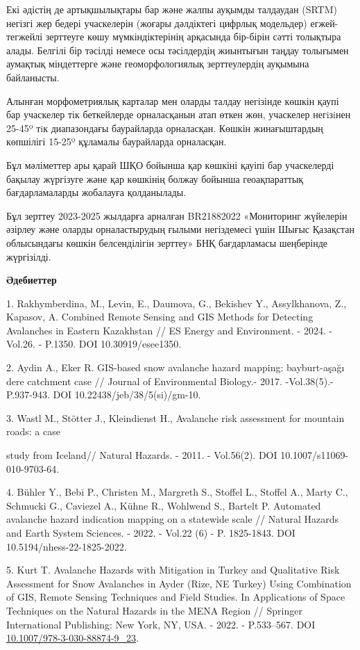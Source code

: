 Екі әдістің де артықшылықтары бар және жалпы ауқымды талдаудан (SRTM)
негізгі жер бедері учаскелерін (жоғары дәлдіктегі цифрлық модельдер)
егжей-тегжейлі зерттеуге көшу мүмкіндіктерінің арқасында бір-бірін сәтті
толықтыра алады. Белгілі бір тәсілді немесе осы тәсілдердің жиынтығын
таңдау толығымен аумақтық міндеттерге және геоморфологиялық
зерттеулердің ауқымына байланысты.

Алынған морфометриялық карталар мен оларды талдау негізінде көшкін қаупі
бар учаскелер тік беткейлерде орналасқанын атап өткен жөн, учаскелер
негiзiнен 25-45º тiк диапазондағы баурайларда орналасқан. Көшкін
жинағыштардың көпшілігі 15-25º құламалы баурайларда орналасқан.

Бұл мәліметтер ары қарай ШҚО бойынша қар көшкіні қауіпі бар учаскелерді
бақылау жүргізуге және қар көшкінің болжау бойынша геоақпараттық
бағдарламаларды жобалауға қолданылады.

Бұл зерттеу 2023-2025 жылдарға арналған BR21882022 «Мониторинг жүйелерін
әзірлеу және оларды орналастырудың ғылыми негіздемесі үшін Шығыс
Қазақстан облысындағы көшкін белсенділігін зерттеу» БНҚ бағдарламасы
шеңберінде жүргізілді.

{\bfseries Әдебиеттер}

1. Rakhymberdina, M., Levin, E., Daumova, G., Bekishev Y., Assylkhanova,
Z., Kapasov, A. Combined Remote Sensing and GIS Methods for Detecting
Avalanches in Eastern Kazakhstan // ES Energy and Environment. - 2024. -
Vol.26. - P.1350. DOI 10.30919/esee1350.

2. Aydin A., Eker R. GIS-based snow avalanche hazard mapping:
bayburt-aşağı dere catchment case // Journal of Environmental Biology.-
2017. -Vol.38(5).- P.937-943. DOI 10.22438/jeb/38/5(si)/gm-10.

3. Wastl M., Stötter J., Kleindienst H., Avalanche risk assessment for
mountain roads: a case

study from Iceland// Natural Hazards. - 2011. - Vol.56(2). DOI
10.1007/s11069-010-9703-64.

4. Bühler Y., Bebi P., Christen M., Margreth S., Stoffel L., Stoffel A.,
Marty C., Schmucki G., Caviezel A., Kühne R., Wohlwend S., Bartelt P.
Automated avalanche hazard indication mapping on a statewide scale //
Natural Hazards and Earth System Sciences. - 2022. - Vol.22 (6) - P.
1825-1843. DOI 10.5194/nhess-22-1825-2022.

5. Kurt T. Avalanche Hazards with Mitigation in Turkey and Qualitative
Risk Assessment for Snow Avalanches in Ayder (Rize, NE Turkey) Using
Combination of GIS, Remote Sensing Techniques and Field Studies. In
Applications of Space Techniques on the Natural Hazards in the MENA
Region // Springer International Publishing: New York, NY, USA. - 2022.
- P.533--567. DOI
\href{http://dx.doi.org/10.1007/978-3-030-88874-9_23}{10.1007/978-3-030-88874-9\_23}.

